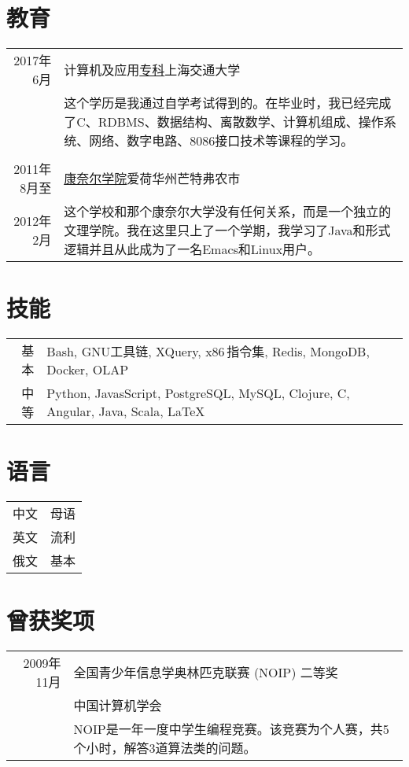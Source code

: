 \documentclass[a4paper,11pt]{article}
\begin{document}
\section{教育}
\begin{tabular}{rp{11.5cm}}
  2017年6月 & 计算机及应用\href{http://www.chsi.com.cn/en/news/201312/20131202/663878204.html}{专科}\quad 上海交通大学\\
            & \footnotesize 这个学历是我通过自学考试得到的。在毕业时，我已经完成了C、RDBMS、数据结构、离散数学、计算机组成、操作系统、网络、数字电路、8086接口技术等课程的学习。\\&\\
  2011年8月至 & \href{http://www.cornellcollege.edu/}{康奈尔学院}\quad 爱荷华州芒特弗农市\\
  2012年2月   & \footnotesize 这个学校和那个康奈尔大学没有任何关系，而是一个独立的文理学院。我在这里只上了一个学期，我学习了Java和形式逻辑并且从此成为了一名Emacs和Linux用户。
\end{tabular}

\section{技能}
\begin{tabular}{rp{12cm}}
  基本 & Bash, GNU工具链, XQuery, x86\,指令集, Redis, MongoDB, Docker, OLAP\\
  中等 & Python, JavasScript, PostgreSQL, MySQL, Clojure, C, Angular, Java, Scala, \LaTeX
\end{tabular}

\section{语言}
\begin{tabular}{rl}
  中文 & 母语\\
  英文 & 流利\\
  俄文 & 基本
\end{tabular}

\section{曾获奖项}
\begin{tabular}{rp{11.6cm}}
  2009年11月 & 全国青少年信息学奥林匹克联赛 (NOIP) 二等奖\\
             & 中国计算机学会\\
             & \footnotesize NOIP是一年一度中学生编程竞赛。该竞赛为个人赛，共5个小时，解答3道算法类的问题。
\end{tabular}
\end{document}
